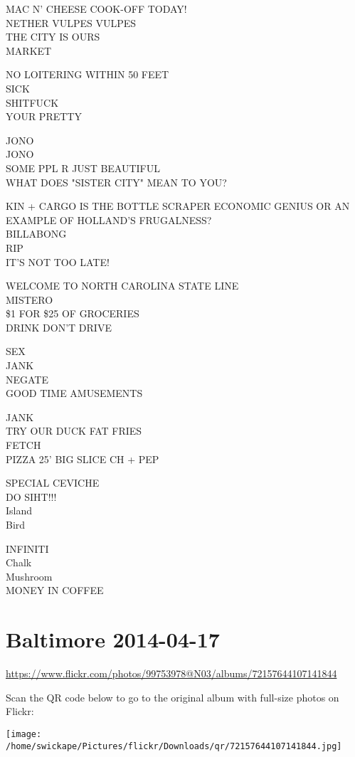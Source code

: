 \documentclass[10pt,letterpaper]{article}
\begin{document}
MAC N' CHEESE COOK{-}OFF TODAY!\\
NETHER VULPES VULPES\\
THE CITY IS OURS\\
MARKET

NO LOITERING WITHIN 50 FEET\\
SICK\\
SHITFUCK\\
YOUR PRETTY

JONO\\
JONO\\
SOME PPL R JUST BEAUTIFUL\\
WHAT DOES "SISTER CITY" MEAN TO YOU?

KIN + CARGO IS THE BOTTLE SCRAPER ECONOMIC GENIUS OR AN EXAMPLE OF HOLLAND'S FRUGALNESS?\\
BILLABONG\\
RIP\\
IT'S NOT TOO LATE!

WELCOME TO NORTH CAROLINA STATE LINE\\
MISTERO\\
\$1 FOR \$25 OF GROCERIES\\
DRINK DON'T DRIVE

SEX\\
JANK\\
NEGATE\\
GOOD TIME AMUSEMENTS

JANK\\
TRY OUR DUCK FAT FRIES\\
FETCH\\
PIZZA 25' BIG SLICE CH + PEP

SPECIAL CEVICHE\\
DO SIHT!!!\\
Island\\
Bird

INFINITI\\
Chalk\\
Mushroom\\
MONEY IN COFFEE


\section*{Baltimore 2014-04-17}

\url{https://www.flickr.com/photos/99753978@N03/albums/72157644107141844}

Scan the QR code below to go to the original album with full-size photos on Flickr:

\texttt{[image: /home/swickape/Pictures/flickr/Downloads/qr/72157644107141844.jpg]}
\end{document}

